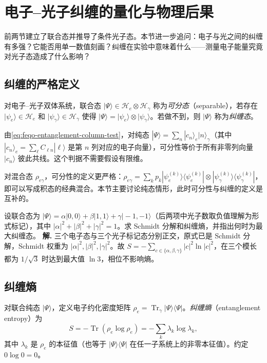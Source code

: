 \section{电子--光子纠缠的量化与物理后果}
\label{chap:feqo-conditioning}

前两节建立了联合态并推导了条件光子态。本节进一步追问：电子与光之间的纠缠有多强？它能否用单一数值刻画？纠缠在实验中意味着什么——测量电子能量究竟对光子态造成了什么影响？

\subsection{纠缠的严格定义}

对电子--光子双体系统，联合态 \(|\Psi\rangle\in\mathcal H_e\otimes\mathcal H_\gamma\) 称为\emph{可分态}（separable），若存在 \(|\psi_e\rangle\in\mathcal H_e\) 和 \(|\psi_\gamma\rangle\in\mathcal H_\gamma\) 使得 \(|\Psi\rangle=|\psi_e\rangle\otimes|\psi_\gamma\rangle\)。若做不到，则 \(|\Psi\rangle\) 称为\emph{纠缠态}。

由\cref{eq:feqo-entanglement-column-test}，对纯态 \(|\Psi\rangle=\sum_n|c_n\rangle_e|n\rangle_\gamma\)（其中 \(|c_n\rangle_e=\sum_\ell C_{\ell n}|\ell\rangle\) 是第 \(n\) 列对应的电子向量），可分性等价于所有非零列向量 \(|c_n\rangle\) 彼此共线。这个判据不需要假设有限维。

对混合态 \(\rho_{e\gamma}\)，可分性的定义更严格：\(\rho_{e\gamma}=\sum_k p_k|\psi_e^{(k)}\rangle\langle\psi_e^{(k)}|\otimes|\psi_\gamma^{(k)}\rangle\langle\psi_\gamma^{(k)}|\)，即可以写成积态的经典混合。本节主要讨论纯态情形，此时可分性与纠缠的定义是互补的。


\par
\begin{workedexample}
设联合态为 \(|\Psi\rangle=\alpha|0,0\rangle+\beta|1,1\rangle+\gamma|-1,-1\rangle\)（后两项中光子数取负值理解为形式标记），其中 \(|\alpha|^2+|\beta|^2+|\gamma|^2=1\)。求 Schmidt 分解和纠缠熵，并指出何时为最大纠缠态。
\textbf{解.} 三个电子态与三个光子标记态分别正交，原式已是 Schmidt 分解，Schmidt 权重为 \(|\alpha|^2,|\beta|^2,|\gamma|^2\)。故 \(S=-\sum_{c\in\{\alpha,\beta,\gamma\}}|c|^2\ln|c|^2\)，在三个模长都为 \(1/\sqrt3\) 时达到最大值 \(\ln3\)，相位不影响熵。
\end{workedexample}
\par
\subsection{纠缠熵}

对联合纯态 \(|\Psi\rangle\)，定义电子约化密度矩阵 \(\rho_e=\operatorname{Tr}_\gamma|\Psi\rangle\langle\Psi|\)。\emph{纠缠熵}（entanglement entropy）为
\begin{equation}
S=-\operatorname{Tr}(\rho_e\log\rho_e)
=-\sum_k\lambda_k\log\lambda_k,
\label{eq:feqo-entanglement-entropy}
\end{equation}
其中 \(\lambda_k\) 是 \(\rho_e\) 的本征值（也等于 \(|\Psi\rangle\langle\Psi|\) 在任一子系统上的非零本征值）。约定 \(0\log 0=0\)。

